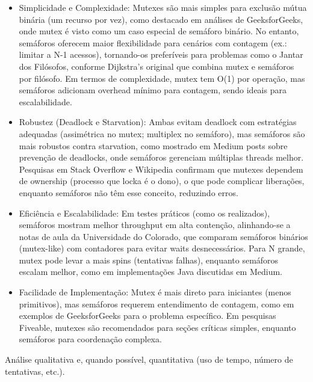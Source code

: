 \begin{itemize}
    \item Simplicidade e Complexidade: Mutexes são mais simples para exclusão mútua binária (um recurso por vez), como destacado em análises de GeeksforGeeks, onde mutex é visto como um caso especial de semáforo binário. No entanto, semáforos oferecem maior flexibilidade para cenários com contagem (ex.: limitar a N-1 acessos), tornando-os preferíveis para problemas como o Jantar dos Filósofos, conforme Dijkstra's original que combina mutex e semáforos por filósofo. Em termos de complexidade, mutex tem O(1) por operação, mas semáforos adicionam overhead mínimo para contagem, sendo ideais para escalabilidade.
    \item Robustez (Deadlock e Starvation): Ambas evitam deadlock com estratégias adequadas (assimétrica no mutex; multiplex no semáforo), mas semáforos são mais robustos contra starvation, como mostrado em Medium posts sobre prevenção de deadlocks, onde semáforos gerenciam múltiplas threads melhor. Pesquisas em Stack Overflow e Wikipedia confirmam que mutexes dependem de ownership (processo que locka é o dono), o que pode complicar liberações, enquanto semáforos não têm esse conceito, reduzindo erros.
    \item Eficiência e Escalabilidade: Em testes práticos (como os realizados), semáforos mostram melhor throughput em alta contenção, alinhando-se a notas de aula da Universidade do Colorado, que comparam semáforos binários (mutex-like) com contadores para evitar waits desnecessários. Para N grande, mutex pode levar a mais spins (tentativas falhas), enquanto semáforos escalam melhor, como em implementações Java discutidas em Medium.
    \item Facilidade de Implementação: Mutex é mais direto para iniciantes (menos primitivos), mas semáforos requerem entendimento de contagem, como em exemplos de GeeksforGeeks para o problema específico. Em pesquisas Fiveable, mutexes são recomendados para seções críticas simples, enquanto semáforos para coordenação complexa.
\end{itemize}

Análise qualitativa e, quando possível, quantitativa (uso de tempo, número de tentativas, etc.).
